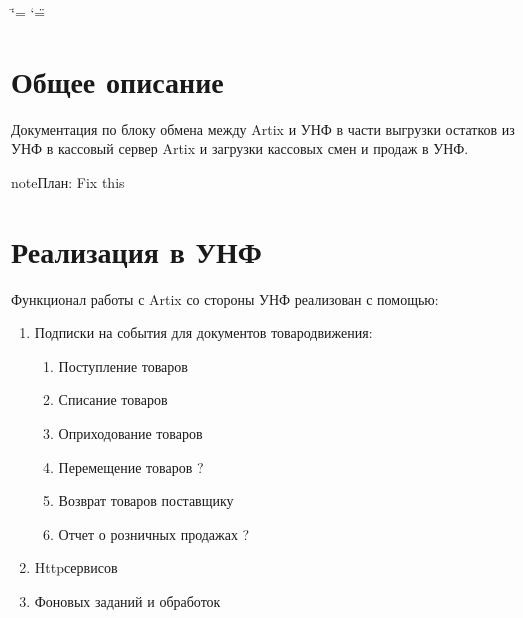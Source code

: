 \documentclass[twoside,11pt,a4paper,notitlepage]{report}
\date{\displaydate{date}}
\begin{document}
\ifdefined\shorthandoff
  \ifnum\catcode`\=\string=\active\shorthandoff{=}\fi
  \ifnum\catcode`\"=\active{}\fi
\fi

\pagestyle{empty}

\pagestyle{plain}
\label{\detokenize{index::doc}}





\chapter{Общее описание}
\label{\detokenize{description:id1}}\label{\detokenize{description::doc}}
\sphinxAtStartPar
Документация по блоку обмена между Artix и УНФ в части выгрузки остатков из УНФ в кассовый сервер Artix и загрузки кассовых смен и продаж в УНФ.

\begin{sphinxadmonition}{note}{\label{\detokenize{description:id2}}План:}
\sphinxAtStartPar
Fix this
\end{sphinxadmonition}

\sphinxstepscope


\chapter{Реализация в УНФ}
\label{\detokenize{unf:id1}}\label{\detokenize{unf::doc}}
\sphinxAtStartPar
Функционал работы с Artix со стороны УНФ реализован с помощью:
\begin{enumerate}
%
\item {} 
\sphinxAtStartPar
Подписки на события для документов товародвижения:
\begin{enumerate}
%
\item {} 
\sphinxAtStartPar
Поступление товаров

\item {} 
\sphinxAtStartPar
Списание товаров

\item {} 
\sphinxAtStartPar
Оприходование товаров

\item {} 
\sphinxAtStartPar
Перемещение товаров ?

\item {} 
\sphinxAtStartPar
Возврат товаров поставщику

\item {} 
\sphinxAtStartPar
Отчет о розничных продажах ?

\end{enumerate}

\item {} 
\sphinxAtStartPar
Http\sphinxhyphen{}сервисов

\item {} 
\sphinxAtStartPar
Фоновых заданий и обработок

\end{enumerate}
\end{document}
